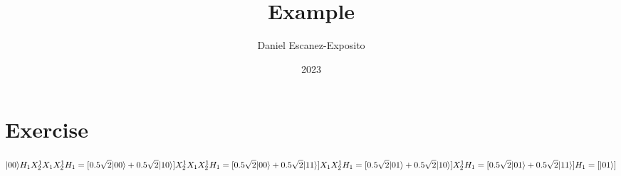 \documentclass{article}
\title{Example}
\author{Daniel Escanez-Exposito}
\date{2023}
\begin{document}
    \maketitle

    \section{Exercise}
    $
     |00\rangle H_{1}X_{2}^{1}X_{1}X_{2}^{1}H_{1}\\ \\ 
= [0.5 \sqrt{2} |00\rangle +0.5 \sqrt{2} |10\rangle ]X_{2}^{1}X_{1}X_{2}^{1}H_{1}\\ \\ 
= [0.5 \sqrt{2} |00\rangle +0.5 \sqrt{2} |11\rangle ]X_{1}X_{2}^{1}H_{1}\\ \\ 
= [0.5 \sqrt{2} |01\rangle +0.5 \sqrt{2} |10\rangle ]X_{2}^{1}H_{1}\\ \\ 
= [0.5 \sqrt{2} |01\rangle +0.5 \sqrt{2} |11\rangle ]H_{1}\\ \\ 
= [ |01\rangle ]\\ 
    $
    
\end{document}
